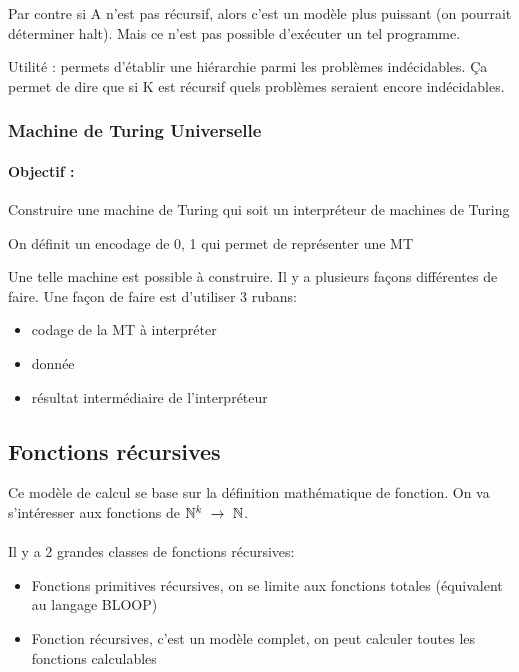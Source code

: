 Par contre si A n'est pas récursif, alors c'est un modèle plus 
puissant (on pourrait déterminer halt). Mais ce n’est pas possible d'exécuter un tel programme. 

\begin{myrem}
	Utilité : permets d'établir une hiérarchie parmi les problèmes 
	indécidables. Ça permet de dire que si K est récursif quels problèmes 
	seraient encore indécidables.
\end{myrem}

\subsubsection{Machine de Turing Universelle}

\paragraph{Objectif :} Construire une machine de Turing qui soit un 
interpréteur de machines de Turing

\begin{myrem}
	On définit un encodage de 0, 1 qui permet de représenter une MT
\end{myrem}

Une telle machine est possible à construire. Il y a plusieurs façons différentes de faire. Une façon de faire est d'utiliser 3 rubans:
\begin{itemize}
	\item codage de la MT à interpréter
	\item donnée
	\item résultat intermédiaire de l'interpréteur
\end{itemize}

\subsection{Fonctions récursives}
\label{sub:fonction_r_cursives}
Ce modèle de calcul se base sur la définition mathématique de fonction. On va 
s'intéresser aux fonctions de $\mathbb{N}^k \ \rightarrow \ \mathbb{N}$.

\paragraph{} Il y a 2 grandes classes de fonctions récursives: 
\begin{itemize}
	\item Fonctions primitives récursives, on se limite aux fonctions totales 
		(équivalent au langage BLOOP)
	\item Fonction récursives, c'est un modèle complet, on peut calculer 
		toutes les fonctions calculables 
\end{itemize}

